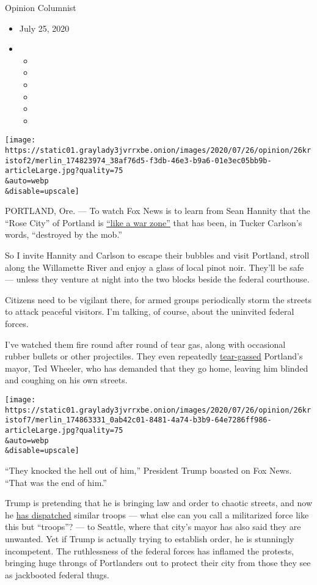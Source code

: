 Opinion Columnist

\begin{itemize}
\item
  July 25, 2020
\item
  \begin{itemize}
  \item
  \item
  \item
  \item
  \item
  \item
  \end{itemize}
\end{itemize}

\texttt{[image: https://static01.graylady3jvrrxbe.onion/images/2020/07/26/opinion/26kristof2/merlin\_174823974\_38af76d5-f3db-46e3-b9a6-01e3ec05bb9b-articleLarge.jpg?quality=75\\\&auto=webp\\\&disable=upscale]}

PORTLAND, Ore. --- To watch Fox News is to learn from Sean Hannity that
the ``Rose City'' of Portland is
\href{https://www.nytimes3xbfgragh.onion/2020/07/22/business/media/trump-limbaugh-hannity.html}{``like
a war zone''} that has been, in Tucker Carlson's words, ``destroyed by
the mob.''

So I invite Hannity and Carlson to escape their bubbles and visit
Portland, stroll along the Willamette River and enjoy a glass of local
pinot noir. They'll be safe --- unless they venture at night into the
two blocks beside the federal courthouse.

Citizens need to be vigilant there, for armed groups periodically storm
the streets to attack peaceful visitors. I'm talking, of course, about
the uninvited federal forces.

I've watched them fire round after round of tear gas, along with
occasional rubber bullets or other projectiles. They even repeatedly
\href{https://www.nytimes3xbfgragh.onion/2020/07/23/us/portland-protest-tear-gas-mayor.html}{tear-gassed}
Portland's mayor, Ted Wheeler, who has demanded that they go home,
leaving him blinded and coughing on his own streets.

\texttt{[image: https://static01.graylady3jvrrxbe.onion/images/2020/07/26/opinion/26kristof7/merlin\_174863331\_0ab42c01-8481-4a74-b3b9-64e7286ff986-articleLarge.jpg?quality=75\\\&auto=webp\\\&disable=upscale]}

``They knocked the hell out of him,'' President Trump boasted on Fox
News. ``That was the end of him.''

Trump is pretending that he is bringing law and order to chaotic
streets, and now he
\href{https://www.nytimes3xbfgragh.onion/2020/07/23/us/seattle-protests-feds.html}{has
dispatched} similar troops --- what else can you call a militarized
force like this but ``troops''? --- to Seattle, where that city's mayor
has also said they are unwanted. Yet if Trump is actually trying to
establish order, he is stunningly incompetent. The ruthlessness of the
federal forces has inflamed the protests, bringing huge throngs of
Portlanders out to protect their city from those they see as jackbooted
federal thugs.

